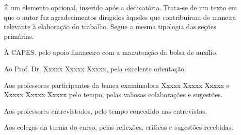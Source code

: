 \begin{agradecimentos}
É um elemento opcional, inserido após a dedicatória. Trata-se de um texto em que o autor faz agradecimentos dirigidos àqueles que contribuíram de maneira relevante à elaboração do trabalho. Segue a mesma tipologia das seções primárias.

À CAPES, pelo apoio financeiro com a manutenção da bolsa de auxílio.

Ao Prof. Dr. Xxxxx Xxxxx Xxxxx, pela excelente orientação.

Aos professores participantes da banca examinadora Xxxxx Xxxxx Xxxxx e Xxxxx Xxxxx Xxxxx pelo tempo, pelas valiosas colaborações e sugestões.

Aos professores entrevistados, pelo tempo concedido nas entrevistas.

Aos colegas da turma do curso, pelas reflexões, críticas e sugestões recebidas.




\end{agradecimentos}